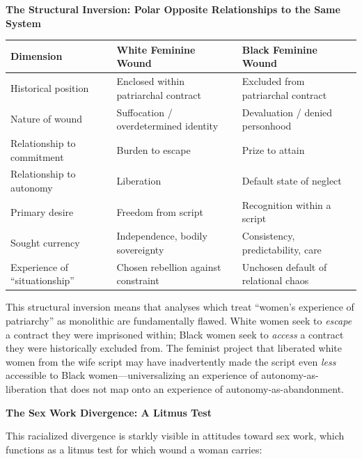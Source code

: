 \documentclass[12pt, letterpaper]{article}
\begin{document}
\textbf{The Structural Inversion: Polar Opposite Relationships to the Same System}

\begin{center}
\begin{tabular}{|p{2in}|p{2in}|p{2in}|}
\hline
\textbf{Dimension} & \textbf{White Feminine Wound} & \textbf{Black Feminine Wound} \\
\hline
Historical position & Enclosed within patriarchal contract & Excluded from patriarchal contract \\
\hline
Nature of wound & Suffocation / overdetermined identity & Devaluation / denied personhood \\
\hline
Relationship to commitment & Burden to escape & Prize to attain \\
\hline
Relationship to autonomy & Liberation & Default state of neglect \\
\hline
Primary desire & Freedom from script & Recognition within a script \\
\hline
Sought currency & Independence, bodily sovereignty & Consistency, predictability, care \\
\hline
Experience of ``situationship'' & Chosen rebellion against constraint & Unchosen default of relational chaos \\
\hline
\end{tabular}
\end{center}

This structural inversion means that analyses which treat ``women's experience of patriarchy'' as monolithic are fundamentally flawed. White women seek to \textit{escape} a contract they were imprisoned within; Black women seek to \textit{access} a contract they were historically excluded from. The feminist project that liberated white women from the wife script may have inadvertently made the script even \textit{less} accessible to Black women---universalizing an experience of autonomy-as-liberation that does not map onto an experience of autonomy-as-abandonment.

\textbf{The Sex Work Divergence: A Litmus Test}

This racialized divergence is starkly visible in attitudes toward sex work, which functions as a litmus test for which wound a woman carries:
\end{document}
